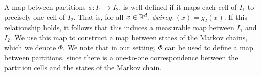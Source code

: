  A map between partitions $\phi: I_1 \rightarrow I_2$, is well-defined if it maps each cell of $I_1$ to precisely one cell of $I_2$. That is, for all $x\in\mathbb{R}^d$, $\phi circ g_1(x) =  g_2(x)$. If this relationship holds, it follows that this induces a measurable map between $I_1$ and $I_2$. We use this map to construct a map between states of the Markov chains, which we denote $\Phi$.  We note that in our setting, $\Phi$ can be used to define a map between partitions, since there is a one-to-one correspondence between the partition cells and the states of the Markov chain.  




